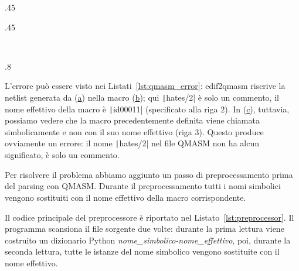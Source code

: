 \begin{listingenv}[h]
	\centering
	\begin{sublisting}[c]{.45\linewidth}
		\caption{Codice Verilog}
		\label{lst:error_verilog}
	\end{sublisting}
	\qquad
	\begin{sublisting}[c]{.45\linewidth}
		\caption{Definizioni delle macro}
		\label{lst:error_def}
	\end{sublisting}
	\\\vspace{.5cm}
	\begin{sublisting}[c]{.8\linewidth}
		\caption{Utilizzo delle macro}
		\label{lst:error_use}
	\end{sublisting}
	\caption{Errore di macro non definite}
	\label{lst:qmasm_error}
\end{listingenv}

L'errore può essere visto nei Listati~\ref{lst:qmasm_error}: edif2qmasm riscrive la netlist generata da (\hyperref[lst:error_verilog]{a}) nella macro (\hyperref[lst:error_def]{b}); qui \texttt|hates/2| è solo un commento, il nome effettivo della macro è \texttt|id00011| (specificato alla riga $2$). In (\hyperref[lst:error_use]{c}), tuttavia, possiamo vedere che la macro precedentemente definita viene chiamata simbolicamente e non con il suo nome effettivo (riga $3$). Questo produce ovviamente un errore: il nome \texttt|hates/2| nel file QMASM non ha alcun significato, è solo un commento.

\begin{listingenv}[h]
	\caption{Nucleo del preprocessore}
	\label{lst:preprocessor}
\end{listingenv}

Per risolvere il problema abbiamo aggiunto un passo di preprocessamento prima del parsing con QMASM. Durante il preprocessamento tutti i nomi simbolici vengono sostituiti con il nome effettivo della macro corrispondente. 

Il codice principale del preprocessore è riportato nel Listato~\ref{lst:preprocessor}. Il programma scansiona il file sorgente due volte: durante la prima lettura viene costruito un dizionario Python \emph{nome\_simbolico-nome\_effettivo}, poi, durante la seconda lettura, tutte le istanze del nome simbolico vengono sostituite con il nome effettivo.

